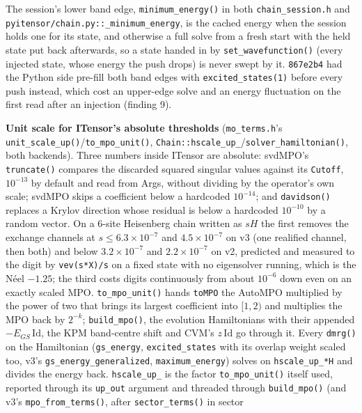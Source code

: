 \documentclass[11pt]{article}
\begin{document}
The session's lower band edge, \texttt{minimum\_energy()} in both
\texttt{chain\_session.h} and
\texttt{pyitensor/chain.py::\_minimum\_energy}, is the cached energy when
the session holds one for its state, and otherwise a full solve from a
fresh start with the held state put back afterwards, so a state handed
in by \texttt{set\_wavefunction()} (every injected state, whose energy
the push drops) is never swept by it. \texttt{867e2b4} had the Python side
pre-fill both band edges with \texttt{excited\_states(1)} before every
push instead, which cost an upper-edge solve and an energy fluctuation on
the first read after an injection (finding 9).

\textbf{Unit scale for ITensor's absolute thresholds}
(\texttt{mo\_terms.h}'s \texttt{unit\_scale\_up()}/\texttt{to\_mpo\_unit()},
\texttt{Chain::hscale\_up\_}/\texttt{solver\_hamiltonian()}, both
backends). Three numbers inside ITensor are absolute: svdMPO's
\texttt{truncate()} compares the discarded squared singular values
against its \texttt{Cutoff}, $10^{-13}$ by default and read from Args,
without dividing by the operator's own scale; svdMPO skips a coefficient
below a hardcoded $10^{-14}$; and \texttt{davidson()} replaces a Krylov
direction whose residual is below a hardcoded $10^{-10}$ by a random
vector. On a 6-site Heisenberg chain written as $sH$ the first removes
the exchange channels at $s\le6.3\times10^{-7}$ and $4.5\times10^{-7}$
on v3 (one realified channel, then both) and below $3.2\times10^{-7}$
and $2.2\times10^{-7}$ on v2, predicted and measured to the digit by
\texttt{vev(s*X)/s} on a fixed state with no eigensolver running, which
is the N\'eel $-1.25$; the third costs digits continuously from about
$10^{-6}$ down even on an exactly scaled MPO. \texttt{to\_mpo\_unit()}
hands \texttt{toMPO} the AutoMPO multiplied by the power of two that
brings its largest coefficient into $[1,2)$ and multiplies the MPO back
by $2^{-k}$; \texttt{build\_mpo()}, the evolution Hamiltonians with
their appended $-E_{GS}\,\mathrm{Id}$, the KPM band-centre shift and
CVM's $z\,\mathrm{Id}$ go through it. Every \texttt{dmrg()} on the
Hamiltonian (\texttt{gs\_energy}, \texttt{excited\_states} with its
overlap weight scaled too, v3's \texttt{gs\_energy\_generalized},
\texttt{maximum\_energy}) solves on \texttt{hscale\_up\_*H} and divides
the energy back. \texttt{hscale\_up\_} is the factor
\texttt{to\_mpo\_unit()} itself used, reported through its
\texttt{up\_out} argument and threaded through \texttt{build\_mpo()} (and
v3's \texttt{mpo\_from\_terms()}, after \texttt{sector\_terms()} in sector
\end{document}
